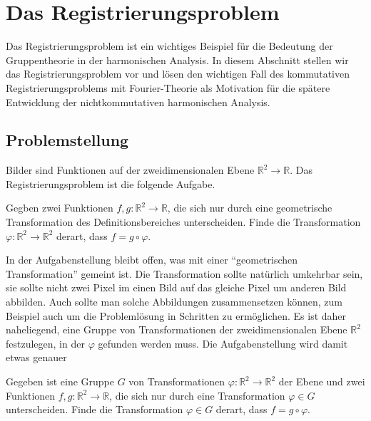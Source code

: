 %
%
%
\section{Das Registrierungsproblem
\label{buch:nichtkomm:section:motivation}}
Das Registrierungsproblem ist ein wichtiges Beispiel für die Bedeutung
der Gruppentheorie in der harmonischen Analysis.
In diesem Abschnitt stellen wir das Registrierungsproblem vor
und lösen den wichtigen Fall des kommutativen Registrierungsproblems
mit Fourier-Theorie als Motivation für die spätere Entwicklung 
der nichtkommutativen harmonischen Analysis.

%
%
\subsection{Problemstellung
\label{buch:nichtkomm:subsection:problemmstellung}}
Bilder sind Funktionen auf der zweidimensionalen Ebene
$\mathbb{R}^2\to\mathbb{R}$.
Das Registrierungsproblem ist die folgende Aufgabe.

\begin{aufgabe}
Gegben zwei Funktionen $f,g\colon\mathbb{R}^2\to\mathbb{R}$, die
sich nur durch eine geometrische Transformation des Definitionsbereiches 
unterscheiden.
Finde die Transformation $\varphi\colon\mathbb{R}^2\to\mathbb{R}^2$ derart,
dass $f=g\circ \varphi$.
\end{aufgabe}

In der Aufgabenstellung bleibt offen, was mit einer ``geometrischen
Transformation'' gemeint ist.
Die Transformation sollte natürlich umkehrbar sein, sie sollte
nicht zwei Pixel im einen Bild auf das gleiche Pixel um anderen
Bild abbilden.
Auch sollte man solche Abbildungen zusammensetzen können, zum
Beispiel auch um die Problemlösung in Schritten zu ermöglichen.
Es ist daher naheliegend, eine Gruppe von Transformationen
der zweidimensionalen Ebene $\mathbb{R}^2$ festzulegen, in der
$\varphi$ gefunden werden muss.
Die Aufgabenstellung wird damit etwas genauer

\begin{aufgabe}
\label{buch:nichtkomm:aufgabe:regG}
Gegeben ist eine Gruppe $G$ von Transformationen
$\varphi:\mathbb{R}^2 \to\mathbb{R}^2$ der Ebene und 
zwei Funktionen $f,g\colon\mathbb{R}^2\to\mathbb{R}$, die sich nur durch
eine Transformation $\varphi\in G$ unterscheiden.
Finde die Transformation $\varphi\in G$ derart,
dass $f=g\circ \varphi$.
\end{aufgabe}

